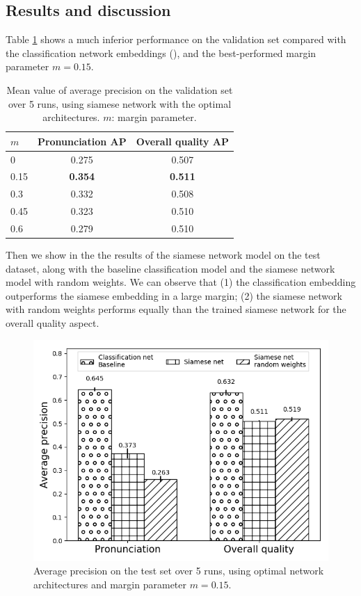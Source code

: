 \subsection{Results and discussion}

Table \ref{tab:ch7:margin_search} shows a much inferior performance on the validation set compared with the classification network embeddings (), and the best-performed margin parameter $m=0.15$. 

\begin{table}[ht!]
\centering
\caption{Mean value of average precision on the validation set over 5 runs, using siamese network with the optimal architectures. $m$: margin parameter.}
\label{tab:ch7:margin_search}
\begin{tabular}{lcc}
\toprule
$m$  & Pronunciation AP & Overall quality AP \\
\midrule
0    & 0.275            & 0.507              \\
0.15 & \textbf{0.354}   & \textbf{0.511}     \\
0.3  & 0.332            & 0.508              \\
0.45 & 0.323            & 0.510              \\
0.6  & 0.279            & 0.510             \\
\bottomrule
\end{tabular}
\end{table}

Then we show in the  the results of the siamese network model on the test dataset, along with the baseline classification model and the siamese network model with random weights. We can observe that (1) the classification embedding outperforms the siamese embedding in a large margin; (2) the siamese network with random weights performs equally than the trained siamese network for the overall quality aspect.

\begin{figure}[ht!]
    \centering
    \includegraphics[width=\textwidth]{figs/ch7/baseline_test_results_dlfm.png}
    \caption{Average precision on the test set over 5 runs, using optimal network architectures and margin parameter $m=0.15$.}
    \label{fig:ch7:baseline_test}
\end{figure}

